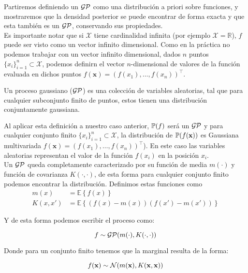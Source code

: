Partiremos definiendo un $\mathcal{GP}$ como una distribución a priori sobre funciones, y mostraremos que la densidad posterior se puede encontrar de forma exacta y que esta también es un $\mathcal{GP}$, conservando sus propiedades.\\

Es importante notar que si $\mathcal{X}$ tiene cardinalidad infinita (por ejemplo $\mathcal{X}=\mathbb{R}$), $f$ puede ser visto como un vector infinito dimensional. Como en la práctica no podemos trabajar con un vector infinito dimensional, dados $n$ puntos $\{ x_i\}_{i=1}^{n}  \subset \mathcal{X}$, podemos definirn el vector $n$-dimensional de valores de la función evaluada en dichos puntos $f(\mathbf{x})=(f(x_1), \ldots, f(x_n))^\top$.

\begin{definition}
	Un proceso gaussiano ($\mathcal{GP}$) es una colección de variables aleatorias, tal que para cualquier subconjunto finito de puntos, estos tienen una distribución conjuntamente gaussiana.
\end{definition}

Al aplicar esta definición a nuestro caso anterior, $\mathbb{P}(f)$ será un $\mathcal{GP}$ y para cualquier conjunto finito $\{ x_i\}_{i=1}^{n}  \subset \mathcal{X}$, la distribución de $\mathbb{P}(f(\mathbf{x}))$ es Gaussiana multivariada $f(\mathbf{x})=(f(x_1), \ldots, f(x_n))^\top$). En este caso las variables aleatorias representan el valor de la función $f(x_i)$ en la posición $x_i$.\\

Un $\mathcal{GP}$ queda completamente caracterizado por su función de media $m(\cdot)$ y función de covarianza $K(\cdot, \cdot)$, de esta forma para cualquier conjunto finito podemos encontrar la distribución. Definimos estas funciones como
\begin{align}
	m(x) & = \mathbb{E}\left\{f(x)\right\}\\
	K(x, x') & = \mathbb{E}\left\{\left(f(x) - m(x)\right) \left(f(x') - m(x') \right)\right\}
\end{align}

Y de esta forma podemos escribir el proceso como:

\begin{equation}
	f \sim \mathcal{GP}(m(\cdot), K(\cdot, \cdot))
\end{equation}

Donde para un conjunto finito tenemos que la marginal resulta de la forma:

\begin{equation}
	f(\mathbf{x}) \sim \mathcal{N}(m(\mathbf{x}), K(\mathbf{x}, \mathbf{x}))
\end{equation}


